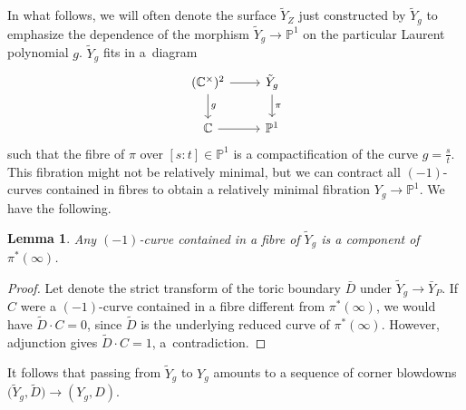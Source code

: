 \documentclass[pdftex]{sigma}
\numberwithin{equation}{section}
\newtheorem{Lemma}[Theorem]{Lemma}
\newcommand{\CC}{\mathbb{C}}
\newcommand{\PP}{\mathbb{P}}
\begin{document}
	In what follows, we will often denote the surface $\tilde{Y}_Z$ just constructed by $\tilde{Y}_g$ to emphasize the dependence of the morphism $\tilde{Y}_g \rightarrow \PP^1$ on the particular Laurent polynomial $g$. $\tilde{Y}_g$ fits in a~diagram
\[
\begin{tikzcd}
	(\CC^\times)^2 \ar[r] \ar[d, "g"]&\tilde{Y}_g\ar[d, "\pi"]\\
	\CC \ar[r]& \PP^1
\end{tikzcd}
\]
such that the fibre of $\pi$ over $[s:t] \in \PP^1$ is a compactification of the curve $g=\tfrac{s}{t}$. This fibration might not be relatively minimal, but we can contract all $(-1)$-curves contained in fibres to obtain a relatively minimal fibration $Y_g \rightarrow \PP^1$. We have the following.
\begin{Lemma}\label{lem:Every-1isToricBlowdown}
	Any $(-1)$-curve contained in a fibre of $\tilde{Y}_g$ is a component of $\pi^{*}(\infty)$.
\end{Lemma}
%
\begin{proof}
	Let  denote the strict transform of the toric boundary $\bar{D}$ under $\tilde{Y}_g \rightarrow \bar{Y}_P$. If $C$ were a $(-1)$-curve contained in a fibre different from $\pi^*(\infty)$, we would have $\tilde{D} \cdot C=0$, since $\tilde{D}$ is the underlying reduced curve of $\pi^*(\infty)$. However, adjunction gives $\tilde{D} \cdot C=1$, a~contradiction.
\end{proof}

It follows that passing from $\tilde{Y}_g$ to $Y_g$ amounts to a sequence of corner blowdowns $\bigl(\tilde{Y}_g, \tilde{D}\bigr) \rightarrow (Y_g, D)$.
\end{document}
